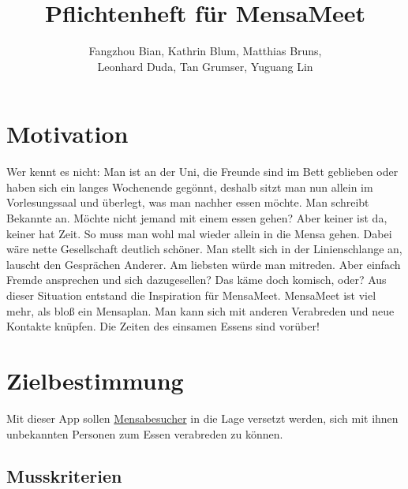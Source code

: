 \documentclass[a4paper]{scrreprt}
\begin{document}
\title{Pflichtenheft für MensaMeet}
\author{Fangzhou Bian, Kathrin Blum, Matthias Bruns, \\Leonhard Duda, Tan Grumser, Yuguang Lin}
\maketitle
\tableofcontents



\chapter{Motivation}

Wer kennt es nicht: Man ist an der Uni, die Freunde sind im Bett geblieben oder haben sich ein langes Wochenende gegönnt, deshalb sitzt man nun allein im Vorlesungssaal und überlegt, was man nachher essen möchte. Man schreibt Bekannte an. Möchte nicht jemand mit einem essen gehen? Aber keiner ist da, keiner hat Zeit. So muss man wohl mal wieder allein in die Mensa gehen. Dabei wäre nette Gesellschaft deutlich schöner. Man stellt sich in der Linienschlange an, lauscht den Gesprächen Anderer. Am liebsten würde man mitreden. Aber einfach Fremde ansprechen und sich dazugesellen? Das käme doch komisch, oder? Aus dieser Situation entstand die Inspiration für MensaMeet. MensaMeet ist viel mehr, als bloß ein Mensaplan. Man kann sich mit anderen Verabreden und neue Kontakte knüpfen. Die Zeiten des einsamen Essens sind vorüber!

\chapter{Zielbestimmung}
Mit dieser App sollen \hyperlink{label1}{Mensabesucher} in die Lage versetzt werden, sich mit ihnen unbekannten Personen zum Essen verabreden zu können.

\section{Musskriterien}
\end{document}
